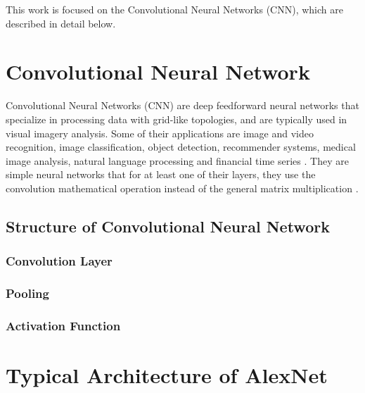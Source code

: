 This work is focused on the Convolutional Neural Networks (CNN), which are described in detail below.

\section{Convolutional Neural Network}
Convolutional Neural Networks (CNN) are deep feedforward neural networks that specialize in processing data with grid-like topologies, and are typically used in visual imagery analysis. Some of their applications are image and video recognition, image classification, object detection, recommender systems, medical image analysis, natural language processing and financial time series \cite{Convolutional-neural-networks-wikipedia}. They are simple neural networks that for at least one of their layers, they use the convolution mathematical operation instead of the general matrix multiplication \cite{Goodfellow-et-al-2016}.

\subsection{Structure of Convolutional Neural Network}

\subsubsection{Convolution Layer}
\subsubsection{Pooling}
\subsubsection{Activation Function}
\section{Typical Architecture of AlexNet}
